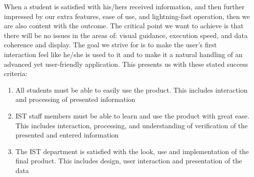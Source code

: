 When a student is satisfied with his/hers received information, and then further impressed by our extra features, ease of use, and lightning-fast operation, then we are also content with the outcome. The critical point we want to achieve is that there will be no issues in the areas of: visual guidance, execution speed, and data coherence and display. The goal we strive for is to make the user's first interaction feel like he/she is used to it and to make it a natural handling of an advanced yet user-friendly application. This presents us with these stated success criteria:

\begin{enumerate}
	\item All students must be able to easily use the product. This includes interaction and processing of presented information
	\item IST staff members must be able to learn and use the product with great ease. This includes interaction, processing, and understanding of verification of the presented and entered information
	\item The IST department is satisfied with the look, use and implementation of the final product. This includes design, user interaction and presentation of the data
\end{enumerate}